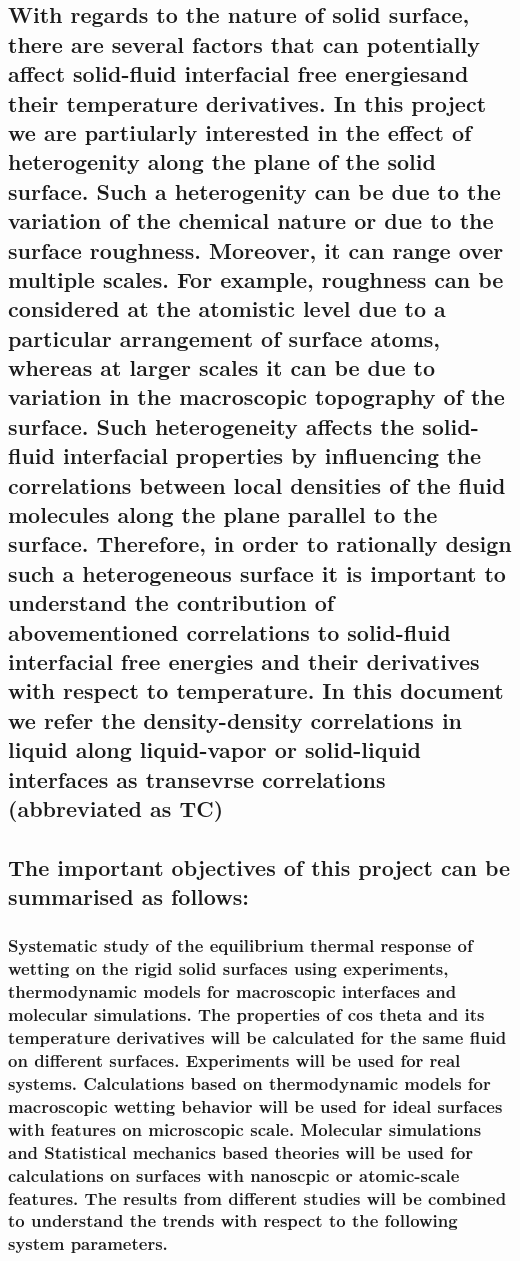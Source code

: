 \documentclass[a4paper,12pt,single,pdftex]{scrartcl}
\begin{document}
\label{ID_412834846}\subsection{With regards to the nature of solid surface, there are several factors that can potentially affect solid-fluid interfacial free energiesand their temperature derivatives. In this project we are partiularly interested in the effect of heterogenity along the plane of the solid surface. Such a heterogenity can be due to the variation of the chemical nature or due to the surface roughness. Moreover,  it can range over multiple scales. For example, roughness can be considered at the atomistic level due to a particular arrangement of surface atoms, whereas at larger scales it can be due to variation in the macroscopic topography of the surface. Such heterogeneity affects the solid-fluid interfacial properties by influencing the correlations between local densities of the fluid molecules along the plane parallel to the surface. Therefore, in order to rationally design such a heterogeneous surface it is important to understand the contribution of abovementioned correlations to solid-fluid interfacial free energies and their derivatives with respect to temperature. In this document we refer the density-density correlations in liquid along liquid-vapor or solid-liquid interfaces as transevrse correlations (abbreviated as TC)}

\label{ID_350936959}\subsection{The important objectives of this project can be summarised as follows:}

\label{ID_1671481601}\subsubsection{Systematic study of the equilibrium thermal response of wetting on the rigid solid surfaces using experiments, thermodynamic models for macroscopic interfaces and molecular simulations. The properties of cos theta and its temperature derivatives will be calculated for the same fluid on different surfaces. Experiments will be used for real systems. Calculations based on thermodynamic models for macroscopic wetting behavior will be used for ideal surfaces with features on microscopic scale. Molecular simulations and Statistical mechanics based theories will be used for calculations on surfaces with nanoscpic or atomic-scale features. The results from different studies will be combined to understand the trends with respect to the following system parameters.}
\end{document}
